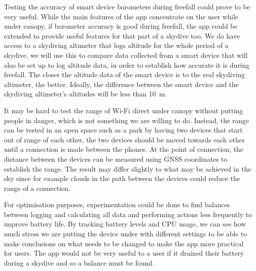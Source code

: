 \documentclass[11pt, a4paper, twocolumn]{article}
\begin{document}
Testing the accuracy of smart device barometers during freefall could prove to be very useful. While the main features of the app concentrate on the user while under canopy, if barometer accuracy is good during freefall, the app could be extended to provide useful features for that part of a skydive too. We do have access to a skydiving altimeter that logs altitude for the whole period of a skydive, we will use this to compare data collected from a smart device that will also be set up to log altitude data, in order to establish how accurate it is during freefall. The closer the altitude data of the smart device is to the real skydiving altimeter, the better. Ideally, the difference between the smart device and the skydiving altimeter's altitudes will be less than \SI{10}{\metre}.

It may be hard to test the range of Wi-Fi direct under canopy without putting people in danger, which is not something we are willing to do. Instead, the range can be tested in an open space such as a park by having two devices that start out of range of each other, the two devices should be moved towards each other until a connection is made between the phones. At the point of connection, the distance between the devices can be measured using GNSS coordinates to establish the range. The result may differ slightly to what may be achieved in the sky since for example clouds in the path between the devices could reduce the range of a connection.

For optimisation purposes, experimentation could be done to find balances between logging and calculating all data and performing actions less frequently to improve battery life. By tracking battery levels and CPU usage, we can see how much stress we are putting the device under with different settings to be able to make conclusions on what needs to be changed to make the app more practical for users. The app would not be very useful to a user if it drained their battery during a skydive and so a balance must be found.
\end{document}
